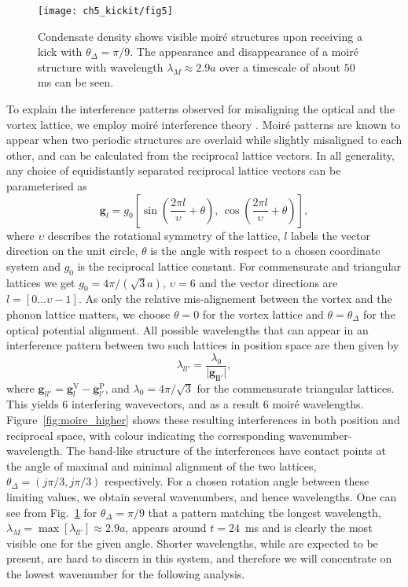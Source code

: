 	\begin{figure}
        \centering
		\texttt{[image: ch5\_kickit/fig5]}
		\caption[Oscillation of moir\'e wavelength.]{Condensate density shows visible moir\'e structures upon receiving a kick with $\theta_\Delta=\pi/9$. The appearance and disappearance of a moir\'e structure with wavelength $\lambda_M \approx 2.9 a$ over a timescale of about $50$ ms can be seen.}
		\label{fig:dtheta20_ev}
	\end{figure}

    To explain the interference patterns observed for misaligning the optical and the vortex lattice, we employ moir\'e interference theory \cite{SS:Hermann_jpcm_2012}. Moir\'e patterns are known to appear when two periodic structures are overlaid while slightly misaligned to each other, and can be calculated from the reciprocal lattice vectors. In all generality, any choice of equidistantly separated reciprocal lattice vectors can be parameterised as
    	\begin{equation}
    		\mathbf{g}_{l} = g_0 \left[ \sin\left( \frac{2\pi l}{\upsilon}+\theta \right),\, \cos\left( \frac{2\pi l}{\upsilon} +\theta\right) \right],
    	\end{equation}
    where $\upsilon$ describes the rotational symmetry of the lattice, $l$ labels the vector direction on the unit circle, $\theta$ is the angle with respect to a chosen coordinate system and $g_0$ is the reciprocal lattice constant. For commensurate and triangular lattices we get $g_0=4\pi/(\sqrt{3}a)$, $\upsilon=6$ and the vector directions are $l=\left[0\dots\upsilon-1\right]$. As only the relative mis-alignement between the vortex and the phonon lattice matters, we choose $\theta=0$ for the vortex lattice and $\theta=\theta_\Delta$ for the optical potential alignment.
    All possible wavelengths that can appear in an interference pattern between two such lattices in position space are then given by
    	\begin{equation}
    		\lambda_{ll'} = \frac{\lambda_0}{|\mathbf{\mathbf{g}_{ll'}|}},
    		\label{eq:InterferenceVectors}
    	\end{equation}
    where
    $\mathbf{g}_{ll'}=\mathbf{g}_{l}^{\text{V}}-\mathbf{g}_{l'}^{\text{P}}$, and
    $\lambda_0 = 4\pi/\sqrt{3}$ for the commensurate triangular lattices. This yields 6 interfering wavevectors, and as a result 6 moir\'e wavelengths. Figure~\ref{fig:moire_higher} shows these resulting interferences in both position and reciprocal space, with colour indicating the corresponding wavenumber-wavelength. The band-like structure of the interferences have contact points at the angle of maximal and minimal alignment of the two lattices, $\theta_\Delta=(j\pi/3,j\pi/3)$ respectively. For a chosen rotation angle between these limiting values, we obtain several wavenumbers, and hence wavelengths. One can see from Fig.~\ref{fig:dtheta20_ev} for $\theta_\Delta = \pi/9$ that a pattern matching the longest wavelength, $\lambda_M= \max[\lambda_{ll'}] \approx 2.9 a$, appears around $t=24$~ms and is clearly the most visible one for the given angle. Shorter wavelengths, while are expected to be present, are hard to discern in this system, and therefore we will concentrate on the lowest wavenumber for the following analysis.

